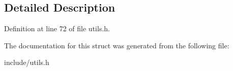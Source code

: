 \subsection{Detailed Description}


Definition at line 72 of file utils.\+h.



The documentation for this struct was generated from the following file\+:\begin{DoxyCompactItemize}
\item 
include/utils.\+h\end{DoxyCompactItemize}

